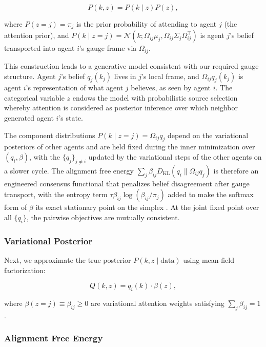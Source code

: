 \documentclass[twoside,11pt]{article}
\begin{document}
\begin{equation}
P(k, z) = P(k \mid z) P(z),
\label{eq:mixture_joint}
\end{equation}

where $P(z = j) = \pi_j$ is the prior probability of attending to agent $j$ (the attention prior), and $P(k \mid z = j) = \mathcal{N}(k; \Omega_{ij}\mu_j, \Omega_{ij}\Sigma_j\Omega_{ij}^\top)$ is agent $j$'s belief transported into agent $i$'s gauge frame via $\Omega_{ij}$.

This construction leads to a generative model consistent with our required gauge structure. Agent $j$'s belief $q_j(k_j)$ lives in $j$'s local frame, and $\Omega_{ij}q_j(k_j)$ is agent $i$'s representation of what agent $j$ believes, as seen by agent $i$. The categorical variable $z$ endows the model with probabilistic source selection whereby attention is considered as posterior inference over which neighbor generated agent $i$'s state.

The component distributions $P(k \mid z{=}j) = \Omega_{ij}q_j$ depend on the variational posteriors of other agents and are held fixed during the inner minimization over $(q_i, \beta)$, with the $\{q_j\}_{j\neq i}$ updated by the variational steps of the other agents on a slower cycle. The alignment free energy $\sum_j \beta_{ij} D_{\mathrm{KL}}(q_i \| \Omega_{ij}q_j)$ is therefore an engineered consensus functional that penalizes belief disagreement after gauge transport, with the entropy term $\tau \beta_{ij}\log(\beta_{ij}/\pi_j)$ added to make the softmax form of $\beta$ its exact stationary point on the simplex \citep{Cuturi2013, Boyd2004}. At the joint fixed point over all $\{q_i\}$, the pairwise objectives are mutually consistent.

\subsubsection{Variational Posterior}

Next, we approximate the true posterior $P(k, z \mid \text{data})$ using mean-field factorization:

\begin{equation}
Q(k, z) = q_i(k) \cdot \beta(z),
\label{eq:mixture_posterior}
\end{equation}

where $\beta(z = j) \equiv \beta_{ij} \geq 0$ are variational attention weights satisfying $\sum_j \beta_{ij} = 1$.

\subsubsection{Alignment Free Energy}
\end{document}
